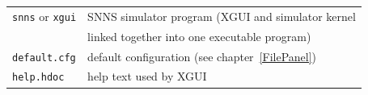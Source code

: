 {\newpage
\clearpage
\samepage \begin{figure}[htbp]
 \begin{center}
  \begin{minipage}[htbp]{\textwidth}
  \end{minipage}
  
  \label{fig:ffmt}
 \end{center}
\end{figure}
}

{\newpage
\clearpage
\samepage \begin{tabular}%
{ll} 
{\tt snns} or {\tt xgui} 
                     & SNNS simulator program (XGUI and simulator kernel\\ 
                     & linked together into one executable program)\\ 
{\tt default.cfg}    & default configuration (see chapter~\ref{FilePanel})\\ 
{\tt help.hdoc}      & help text used by XGUI\\ 
\end{tabular}
}

{\newpage
\clearpage
\samepage {}
}

{\newpage
\clearpage
\samepage {}
}

{\newpage
\clearpage
\samepage {}
}

{\newpage
\clearpage
\samepage \begin{figure}[htbp]
\begin{center}
  \begin{minipage}{\textwidth}
  \end{minipage}

\label{ManagerControlDisplay}
\end{center}
\end{figure}
}

{\newpage
\clearpage
\samepage {}
}

{\newpage
\clearpage
\samepage {}
}

{\newpage
\clearpage
\samepage {}
}

{\newpage
\clearpage
\samepage \begin{figure}[bthp]
\begin{center}
  \begin{minipage}{\textwidth}
  \end{minipage}

\label{FigManagerPanel}
\end{center}
\end{figure}
}

